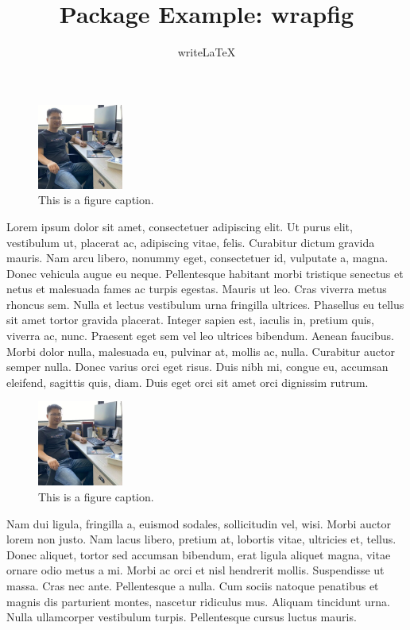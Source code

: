 \documentclass[a4paper]{article}
\title{Package Example: wrapfig}
\author{writeLaTeX}
\begin{document}
	\maketitle
	
	\begin{figure}
		\centering
		\includegraphics[width=0.25\textwidth]{ShowMe.jpg}
		\caption{\label{fig:frog1}This is a figure caption.}
	\end{figure}
	
	Lorem ipsum dolor sit amet, consectetuer
	adipiscing elit. Ut purus elit, vestibulum ut, placerat ac, adipiscing vitae, 
	felis. Curabitur dictum gravida mauris. Nam arcu libero, nonummy eget, 
	consectetuer id, vulputate a, magna. Donec vehicula augue eu neque. 
	Pellentesque habitant morbi tristique senectus et netus et malesuada fames ac 
	turpis egestas. Mauris ut leo. Cras viverra metus rhoncus sem. Nulla et 
	lectus vestibulum urna fringilla ultrices.  Phasellus eu tellus sit amet 
	tortor gravida placerat. Integer sapien est, iaculis in, pretium quis, 
	viverra ac, nunc. Praesent eget sem vel leo ultrices bibendum. Aenean 
	faucibus.
	Morbi dolor nulla, malesuada eu, pulvinar at, mollis ac, nulla. Curabitur 
	auctor semper nulla. Donec varius orci eget risus. Duis nibh mi, congue eu, 
	accumsan eleifend, sagittis quis, diam. Duis eget orci sit amet orci 
	dignissim rutrum.
	
	\begin{figure}
		\centering
		\includegraphics[width=0.25\textwidth]{ShowMe.jpg}
		\caption{\label{fig:frog2}This is a figure caption.}
	\end{figure}
	
	Nam dui ligula, fringilla a, euismod sodales, sollicitudin vel, wisi. Morbi 
	auctor lorem non justo. Nam lacus libero, pretium at, lobortis vitae, 
	ultricies et, tellus. Donec aliquet, tortor sed accumsan bibendum, erat 
	ligula aliquet magna, vitae ornare odio metus a mi. Morbi ac orci et nisl 
	hendrerit mollis. Suspendisse ut massa. Cras nec ante. Pellentesque a nulla. 
	Cum sociis natoque penatibus et magnis dis parturient montes, nascetur 
	ridiculus mus. Aliquam tincidunt urna. Nulla ullamcorper vestibulum turpis. 
	Pellentesque cursus luctus mauris.
	
\end{document}
